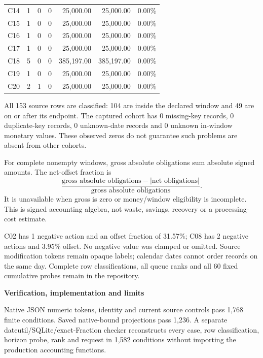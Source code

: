 \documentclass[11pt,letterpaper]{article}
\newcommand{\heading}[1]{\vspace{5pt}{\large\bfseries #1}\par}
\newcommand{\BoundCA}{1}
\newcommand{\BoundCB}{0}
\newcommand{\BoundCC}{0}
\newcommand{\BoundCD}{25,000.00}
\newcommand{\BoundCE}{25,000.00}
\newcommand{\BoundCF}{0.00}
\newcommand{\BoundCG}{1}
\newcommand{\BoundCH}{0}
\newcommand{\BoundCI}{0}
\newcommand{\BoundCJ}{25,000.00}
\newcommand{\BoundCK}{25,000.00}
\newcommand{\BoundCL}{0.00}
\newcommand{\BoundCM}{1}
\newcommand{\BoundCN}{0}
\newcommand{\BoundCO}{0}
\newcommand{\BoundCP}{25,000.00}
\newcommand{\BoundCQ}{25,000.00}
\newcommand{\BoundCR}{0.00}
\newcommand{\BoundCS}{1}
\newcommand{\BoundCT}{0}
\newcommand{\BoundCU}{0}
\newcommand{\BoundCV}{25,000.00}
\newcommand{\BoundCW}{25,000.00}
\newcommand{\BoundCX}{0.00}
\newcommand{\BoundCY}{5}
\newcommand{\BoundCZ}{0}
\newcommand{\BoundDA}{0}
\newcommand{\BoundDB}{385,197.00}
\newcommand{\BoundDC}{385,197.00}
\newcommand{\BoundDD}{0.00}
\newcommand{\BoundDE}{1}
\newcommand{\BoundDF}{0}
\newcommand{\BoundDG}{0}
\newcommand{\BoundDH}{25,000.00}
\newcommand{\BoundDI}{25,000.00}
\newcommand{\BoundDJ}{0.00}
\newcommand{\BoundDK}{2}
\newcommand{\BoundDL}{1}
\newcommand{\BoundDM}{0}
\newcommand{\BoundDN}{25,000.00}
\newcommand{\BoundDO}{25,000.00}
\newcommand{\BoundDP}{0.00}
\newcommand{\BoundED}{153}
\newcommand{\BoundEE}{104}
\newcommand{\BoundEF}{49}
\newcommand{\BoundEG}{0}
\newcommand{\BoundEH}{0}
\newcommand{\BoundEI}{0}
\newcommand{\BoundEJ}{0}
\newcommand{\BoundEK}{1}
\newcommand{\BoundEL}{31.57}
\newcommand{\BoundEM}{2}
\newcommand{\BoundEN}{3.95}
\newcommand{\BoundEO}{60}
\newcommand{\BoundEP}{1,768}
\newcommand{\BoundEQ}{1,236}
\newcommand{\BoundER}{1,582}
\begin{document}
{\begin{tabular}{@{}lrrrrrr@{}}
C14 & \BoundCA{} & \BoundCB{} & \BoundCC{} & \BoundCD{} & \BoundCE{} & \BoundCF{}\% \\
C15 & \BoundCG{} & \BoundCH{} & \BoundCI{} & \BoundCJ{} & \BoundCK{} & \BoundCL{}\% \\
C16 & \BoundCM{} & \BoundCN{} & \BoundCO{} & \BoundCP{} & \BoundCQ{} & \BoundCR{}\% \\
C17 & \BoundCS{} & \BoundCT{} & \BoundCU{} & \BoundCV{} & \BoundCW{} & \BoundCX{}\% \\
C18 & \BoundCY{} & \BoundCZ{} & \BoundDA{} & \BoundDB{} & \BoundDC{} & \BoundDD{}\% \\
C19 & \BoundDE{} & \BoundDF{} & \BoundDG{} & \BoundDH{} & \BoundDI{} & \BoundDJ{}\% \\
C20 & \BoundDK{} & \BoundDL{} & \BoundDM{} & \BoundDN{} & \BoundDO{} & \BoundDP{}\% \\
\bottomrule
\end{tabular}
}

\heading{Interpretation and complete exclusions}
All \BoundED{} source rows are classified: \BoundEE{} are inside the declared window and \BoundEF{} are on or after its endpoint. The captured cohort has \BoundEG{} missing-key records, \BoundEH{} duplicate-key records, \BoundEI{} unknown-date records and \BoundEJ{} unknown in-window monetary values. These observed zeros do not guarantee such problems are absent from other cohorts.

For complete nonempty windows, gross absolute obligations sum absolute signed amounts. The net-offset fraction is
\[
 \frac{\text{gross absolute obligations}-|\text{net obligations}|}
 {\text{gross absolute obligations}}.
\]
It is unavailable when gross is zero or money/window eligibility is incomplete. This is signed accounting algebra, not waste, savings, recovery or a processing-cost estimate.

C02 has \BoundEK{} negative action and an offset fraction of \BoundEL{}\%; C08 has \BoundEM{} negative actions and \BoundEN{}\% offset. No negative value was clamped or omitted. Source modification tokens remain opaque labels; calendar dates cannot order records on the same day. Complete row classifications, all queue ranks and all \BoundEO{} fixed cumulative probes remain in the repository.
\newpage
{\Large\bfseries Verification, implementation and limits\par}

\heading{Independent checks and chronology}
Native JSON numeric tokens, identity and current source controls pass \BoundEP{} finite conditions. Saved native-bound projections pass \BoundEQ{}. A separate dateutil/SQLite/exact-Fraction checker reconstructs every case, row classification, horizon probe, rank and request in \BoundER{} conditions without importing the production accounting functions.
\end{document}
